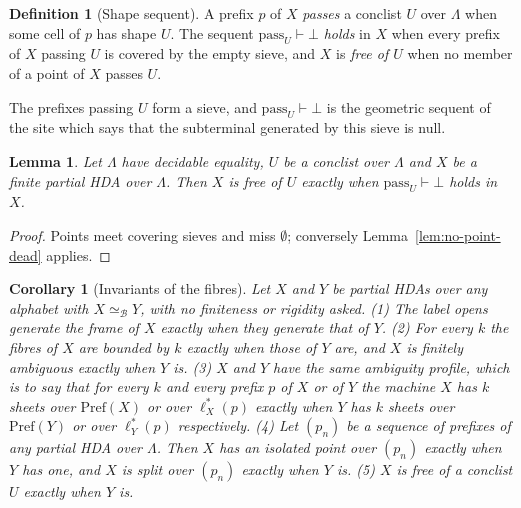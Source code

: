 \documentclass{lmcs}
\newtheorem{lemma}[theorem]{Lemma}
\newtheorem{corollary}[theorem]{Corollary}
\theoremstyle{definition}
\newtheorem{definition}[theorem]{Definition}
\theoremstyle{remark}
\newcommand{\Pref}{\mathrm{Pref}}
\providecommand{\eqB}{\simeq_{\mathcal{B}}}
\providecommand{\lst}[1]{\ell^{*}_{#1}}
\begin{document}
\begin{definition}[Shape sequent]\label{def:image-shape}
A prefix $p$ of $X$ \emph{passes} a conclist $U$ over $\Lambda$ when some cell of $p$ has shape $U$. The sequent $\mathrm{pass}_U\vdash\bot$ \emph{holds} in $X$ when every prefix of
$X$ passing $U$ is covered by the empty sieve, and $X$ is \emph{free
of $U$} when no member of a point of $X$ passes $U$.
\end{definition}

The prefixes passing $U$ form a sieve, and $\mathrm{pass}_U\vdash\bot$ is the
geometric sequent of the site which says that the subterminal generated by this sieve is null.

\begin{lemma}\label{prop:image-shape}
Let $\Lambda$ have decidable equality, $U$ be a conclist over $\Lambda$ and $X$ be a finite partial HDA over
$\Lambda$. Then $X$ is free of $U$ exactly when $\mathrm{pass}_U\vdash\bot$ holds in $X$.
\end{lemma}

\begin{proof}
Points meet covering sieves and miss $\emptyset$; conversely
Lemma~\ref{lem:no-point-dead} applies.
\end{proof}

\begin{corollary}[Invariants of the fibres]\label{thm:image-profile}\label{def:image-profile}
Let $X$ and $Y$ be partial HDAs over any alphabet with $X\eqB Y$, with no finiteness or rigidity asked.
(1) The label opens generate the frame of $X$ exactly when they generate that of
$Y$.
(2)\label{thm:fib-inv} For every $k$ the fibres of $X$ are bounded by $k$ exactly when those of $Y$
are, and $X$ is finitely ambiguous exactly when $Y$
is.
(3) $X$ and $Y$ have the same \emph{ambiguity profile}, which is to say that for every $k$ and every prefix $p$ of
$X$ or of $Y$ the machine $X$ has $k$ sheets over $\Pref(X)$ or over $\lst{X}(p)$ exactly when $Y$ has $k$ sheets
over $\Pref(Y)$ or over $\lst{Y}(p)$ respectively.
(4) Let $(p_n)$ be a sequence of prefixes of any partial HDA over $\Lambda$. Then $X$ has an isolated point over
$(p_n)$ exactly when $Y$ has one, and
$X$ is split over $(p_n)$ exactly when $Y$ is.
(5) $X$ is free of a conclist $U$ exactly when $Y$
is.
\end{corollary}
\end{document}

